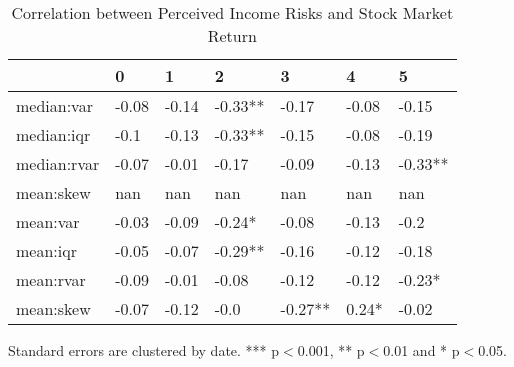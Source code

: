 \documentclass[12pt,notitlepage,onecolumn,aps,pra]{revtex4-1}
\begin{document}
\begin{table}[ht]
\begin{threeparttable}
\caption{Correlation between Perceived Income Risks and Stock Market Return}
\label{macro_corr}\begin{tabular}{lllllll}
\toprule
{} &      0 &      1 &        2 &        3 &      4 &        5 \\
\midrule
median:var  &  -0.08 &  -0.14 &  -0.33** &    -0.17 &  -0.08 &    -0.15 \\
median:iqr  &   -0.1 &  -0.13 &  -0.33** &    -0.15 &  -0.08 &    -0.19 \\
median:rvar &  -0.07 &  -0.01 &    -0.17 &    -0.09 &  -0.13 &  -0.33** \\
mean:skew   &    nan &    nan &      nan &      nan &    nan &      nan \\
mean:var    &  -0.03 &  -0.09 &   -0.24* &    -0.08 &  -0.13 &     -0.2 \\
mean:iqr    &  -0.05 &  -0.07 &  -0.29** &    -0.16 &  -0.12 &    -0.18 \\
mean:rvar   &  -0.09 &  -0.01 &    -0.08 &    -0.12 &  -0.12 &   -0.23* \\
mean:skew   &  -0.07 &  -0.12 &     -0.0 &  -0.27** &  0.24* &    -0.02 \\
\bottomrule
\end{tabular}
\begin{tablenotes}
\item Standard errors are clustered by date. *** p$<$0.001, ** p$<$0.01 and * p$<$0.05. 
\end{tablenotes}
\end{threeparttable}
\end{table}       %
    
    



    
    
\end{document}
